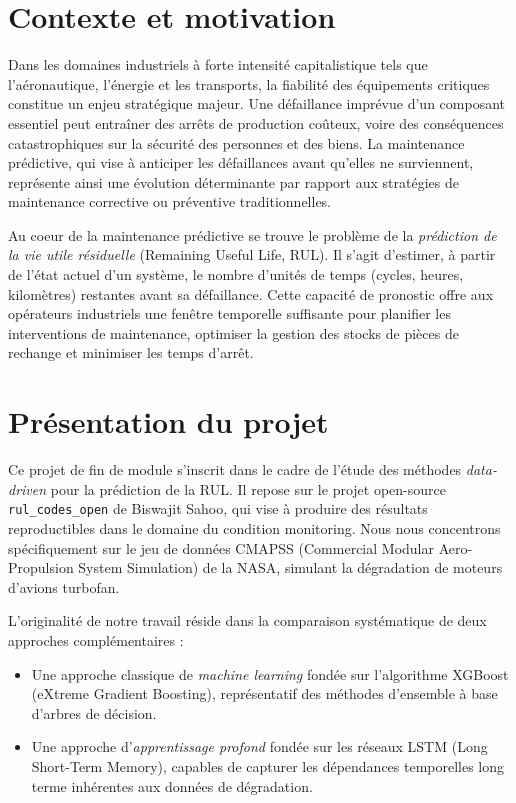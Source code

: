 \documentclass[12pt,a4paper]{report}
\theoremstyle{definition}
\begin{document}
\section{Contexte et motivation}

Dans les domaines industriels à forte intensité capitalistique tels que l'aéronautique, l'énergie et les transports, la fiabilité des équipements critiques constitue un enjeu stratégique majeur. Une défaillance imprévue d'un composant essentiel peut entraîner des arrêts de production coûteux, voire des conséquences catastrophiques sur la sécurité des personnes et des biens. La maintenance prédictive, qui vise à anticiper les défaillances avant qu'elles ne surviennent, représente ainsi une évolution déterminante par rapport aux stratégies de maintenance corrective ou préventive traditionnelles.

Au coeur de la maintenance prédictive se trouve le problème de la \emph{prédiction de la vie utile résiduelle} (Remaining Useful Life, RUL). Il s'agit d'estimer, à partir de l'état actuel d'un système, le nombre d'unités de temps (cycles, heures, kilomètres) restantes avant sa défaillance. Cette capacité de pronostic offre aux opérateurs industriels une fenêtre temporelle suffisante pour planifier les interventions de maintenance, optimiser la gestion des stocks de pièces de rechange et minimiser les temps d'arrêt.

\section{Présentation du projet}

Ce projet de fin de module s'inscrit dans le cadre de l'étude des méthodes \emph{data-driven} pour la prédiction de la RUL. Il repose sur le projet open-source \texttt{rul\_codes\_open} de Biswajit Sahoo, qui vise à produire des résultats reproductibles dans le domaine du condition monitoring. Nous nous concentrons spécifiquement sur le jeu de données CMAPSS (Commercial Modular Aero-Propulsion System Simulation) de la NASA, simulant la dégradation de moteurs d'avions turbofan.

L'originalité de notre travail réside dans la comparaison systématique de deux approches complémentaires :
\begin{itemize}
    \item Une approche classique de \emph{machine learning} fondée sur l'algorithme XGBoost (eXtreme Gradient Boosting), représentatif des méthodes d'ensemble à base d'arbres de décision.
    \item Une approche d'\emph{apprentissage profond} fondée sur les réseaux LSTM (Long Short-Term Memory), capables de capturer les dépendances temporelles long terme inhérentes aux données de dégradation.
\end{itemize}
\end{document}

